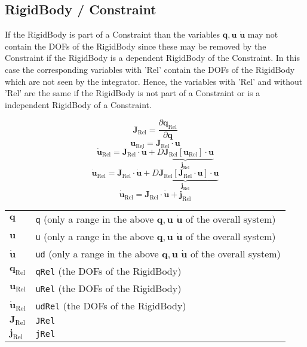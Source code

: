 \documentclass{article}
\newcommand{\bs}[1]{\boldsymbol #1}
\begin{document}
\subsection{RigidBody / Constraint}

If the RigidBody is part of a Constraint than the variables $\bs{q}, \bs{u}$ $\dot{\bs{u}}$ may not contain the DOFs of the RigidBody since these may be removed by the Constraint if the RigidBody is a dependent RigidBody of the Constraint. In this case the corresponding variables with 'Rel' contain the DOFs of the RigidBody which are not seen by the integrator. Hence, the variables with 'Rel' and without 'Rel' are the same if the RigidBody is not part of a Constraint or is a independent RigidBody of a Constraint.

\begin{equation}
  \bs{J}_\text{Rel}=\frac{\partial\bs{q}_\text{Rel}}{\partial\bs{q}}
\end{equation}
\begin{equation}
  \bs{u}_\text{Rel}=\bs{J}_\text{Rel}\cdot\bs{u}
\end{equation}
\begin{equation}
  \dot{\bs{u}}_\text{Rel}=\bs{J}_\text{Rel}\cdot\dot{\bs{u}}+\underbrace{D\bs{J}_\text{Rel}[\bs{u}_\text{Rel}]\cdot\bs{u}}_{\bs{j}_\text{Rel}}
\end{equation}
\begin{equation}
  \dot{\bs{u}}_\text{Rel}=\bs{J}_\text{Rel}\cdot\dot{\bs{u}}+\underbrace{D\bs{J}_\text{Rel}[\bs{J}_\text{Rel}\cdot\bs{u}]\cdot\bs{u}}_{\bs{j}_\text{Rel}}
\end{equation}
\begin{equation}
  \dot{\bs{u}}_\text{Rel}=\bs{J}_\text{Rel}\cdot\dot{\bs{u}}+\bs{j}_\text{Rel}
\end{equation}

\begin{tabular}{|l|p{10cm}|}
  \hline
  $\bs{q}$ & \texttt{q} (only a range in the above $\bs{q}, \bs{u}$ $\dot{\bs{u}}$ of the overall system)\\
  $\bs{u}$ & \texttt{u} (only a range in the above $\bs{q}, \bs{u}$ $\dot{\bs{u}}$ of the overall system)\\
  $\dot{\bs{u}}$ & \texttt{ud} (only a range in the above $\bs{q}, \bs{u}$ $\dot{\bs{u}}$ of the overall system)\\
  $\bs{q}_\text{Rel}$ & \texttt{qRel} (the DOFs of the RigidBody) \\
  $\bs{u}_\text{Rel}$ & \texttt{uRel} (the DOFs of the RigidBody) \\
  $\dot{\bs{u}}_\text{Rel}$ & \texttt{udRel} (the DOFs of the RigidBody) \\
  $\bs{J}_\text{Rel}$ & \texttt{JRel} \\
  $\bs{j}_\text{Rel}$ & \texttt{jRel} \\
  \hline
\end{tabular}
\end{document}
